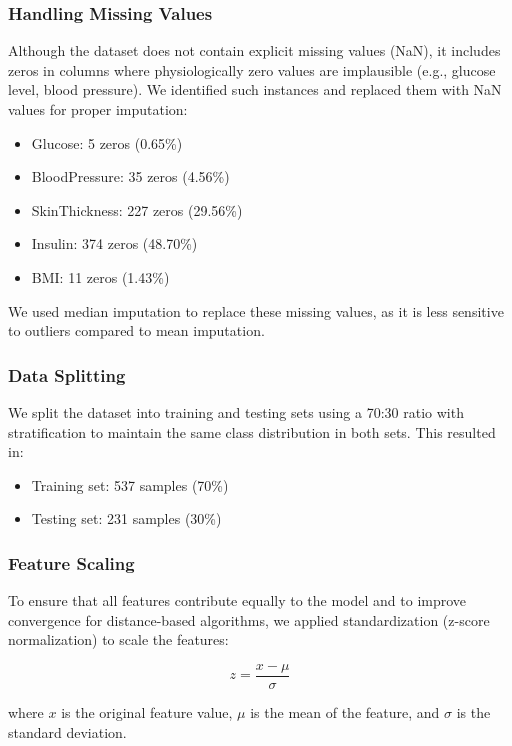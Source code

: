 \documentclass[conference]{IEEEtran}
\begin{document}
\subsubsection{Handling Missing Values}
Although the dataset does not contain explicit missing values (NaN), it includes zeros in columns where physiologically zero values are implausible (e.g., glucose level, blood pressure). We identified such instances and replaced them with NaN values for proper imputation:

\begin{itemize}
    \item Glucose: 5 zeros (0.65\%)
    \item BloodPressure: 35 zeros (4.56\%)
    \item SkinThickness: 227 zeros (29.56\%)
    \item Insulin: 374 zeros (48.70\%)
    \item BMI: 11 zeros (1.43\%)
\end{itemize}

We used median imputation to replace these missing values, as it is less sensitive to outliers compared to mean imputation.

\subsubsection{Data Splitting}
We split the dataset into training and testing sets using a 70:30 ratio with stratification to maintain the same class distribution in both sets. This resulted in:
\begin{itemize}
    \item Training set: 537 samples (70\%)
    \item Testing set: 231 samples (30\%)
\end{itemize}

\subsubsection{Feature Scaling}
To ensure that all features contribute equally to the model and to improve convergence for distance-based algorithms, we applied standardization (z-score normalization) to scale the features:

\begin{equation}
z = \frac{x - \mu}{\sigma}
\end{equation}

where $x$ is the original feature value, $\mu$ is the mean of the feature, and $\sigma$ is the standard deviation.
\end{document}
